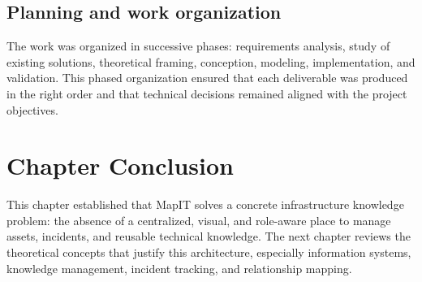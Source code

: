\subsection{Planning and work organization}
The work was organized in successive phases: requirements analysis, study of existing solutions, theoretical framing, conception, modeling, implementation, and validation. This phased organization ensured that each deliverable was produced in the right order and that technical decisions remained aligned with the project objectives.

\section{Chapter Conclusion}
This chapter established that MapIT solves a concrete infrastructure knowledge problem: the absence of a centralized, visual, and role-aware place to manage assets, incidents, and reusable technical knowledge. The next chapter reviews the theoretical concepts that justify this architecture, especially information systems, knowledge management, incident tracking, and relationship mapping.
